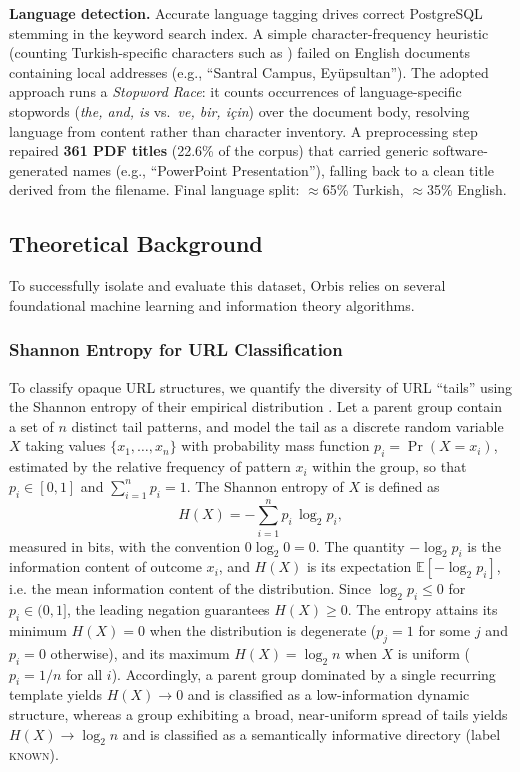 \documentclass[a4paper,12pt]{article}
\renewcommand{\texttt}[1]{{\ttfamily\seqsplit{#1}}}
\begin{document}
\textbf{Language detection.} Accurate language tagging drives correct PostgreSQL stemming in the keyword search index. A simple character-frequency heuristic (counting Turkish-specific characters such as \texttt{\i, ğ, ş}) failed on English documents containing local addresses (e.g., ``Santral Campus, Eyüpsultan''). The adopted approach runs a \textit{Stopword Race}: it counts occurrences of language-specific stopwords (\textit{the, and, is} vs.\ \textit{ve, bir, için}) over the document body, resolving language from content rather than character inventory. A \texttt{fix\_pdf\_language\_and\_titles.py} preprocessing step repaired \textbf{361 PDF titles} (22.6\% of the corpus) that carried generic software-generated names (e.g., ``PowerPoint Presentation''), falling back to a clean title derived from the filename. Final language split: $\approx$65\% Turkish, $\approx$35\% English.

\subsection{Theoretical Background}
\label{sec:theory}
To successfully isolate and evaluate this dataset, Orbis relies on several foundational machine learning and information theory algorithms. 

\subsubsection{Shannon Entropy for URL Classification}
To classify opaque URL structures, we quantify the diversity of URL ``tails'' using the Shannon entropy of their empirical distribution \cite{shannon1948mathematical}. Let a parent group contain a set of $n$ distinct tail patterns, and model the tail as a discrete random variable $X$ taking values $\{x_1, \dots, x_n\}$ with probability mass function $p_i = \Pr(X = x_i)$, estimated by the relative frequency of pattern $x_i$ within the group, so that $p_i \in [0,1]$ and $\sum_{i=1}^{n} p_i = 1$. The Shannon entropy of $X$ is defined as
$$H(X) = -\sum_{i=1}^{n} p_i \, \log_2 p_i,$$
measured in bits, with the convention $0 \log_2 0 = 0$. The quantity $-\log_2 p_i$ is the information content of outcome $x_i$, and $H(X)$ is its expectation $\mathbb{E}[-\log_2 p_i]$, i.e. the mean information content of the distribution. Since $\log_2 p_i \le 0$ for $p_i \in (0,1]$, the leading negation guarantees $H(X) \ge 0$. The entropy attains its minimum $H(X) = 0$ when the distribution is degenerate ($p_j = 1$ for some $j$ and $p_i = 0$ otherwise), and its maximum $H(X) = \log_2 n$ when $X$ is uniform ($p_i = 1/n$ for all $i$). Accordingly, a parent group dominated by a single recurring template yields $H(X) \to 0$ and is classified as a low-information dynamic structure, whereas a group exhibiting a broad, near-uniform spread of tails yields $H(X) \to \log_2 n$ and is classified as a semantically informative directory (label \textsc{known}).
\end{document}
